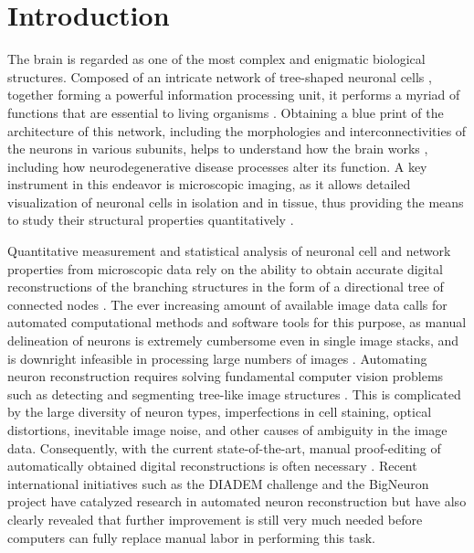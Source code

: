 \section{Introduction}
\label{sec:intro}
The brain is regarded as one of the most complex and enigmatic biological structures. Composed of an intricate network of tree-shaped neuronal cells \cite{ascolitrees}, together forming a powerful information processing unit, it performs a myriad of functions that are essential to living organisms \cite{kandel2000principles}. Obtaining a blue print of the architecture of this network, including the morphologies and interconnectivities of the neurons in various subunits, helps to understand how the brain works \cite{ascoli2002computational, donohue2008comparative, cuntz2010one}, including how  neurodegenerative disease processes alter its function. A key instrument in this endeavor is microscopic imaging, as it allows detailed visualization of neuronal cells in isolation and in tissue, thus providing the means to study their structural properties quantitatively \cite{senft2011brief}.

Quantitative measurement and statistical analysis of neuronal cell and network properties from microscopic data rely on the ability to obtain accurate digital reconstructions of the branching structures \cite{halavi2012digital} in the form of a directional tree of connected nodes \cite{ascoli2007neuromorpho}. The ever increasing amount of available image data calls for automated computational methods and software tools for this purpose, as manual delineation of neurons is extremely cumbersome even in single image stacks, and is downright infeasible in processing large numbers of images \cite{svoboda2011past, senft2011brief}. Automating neuron reconstruction requires solving fundamental computer vision problems such as detecting and segmenting tree-like image structures \cite{meijering2010neuron, donohue2011automated, acciai2016automated}. This is complicated by the large diversity of neuron types, imperfections in cell staining, optical distortions, inevitable image noise, and other causes of ambiguity in the image data. Consequently, with the current state-of-the-art, manual proof-editing of automatically obtained digital reconstructions is often necessary \cite{peng2011proof}. Recent international initiatives such as the DIADEM challenge \cite{gillette2011diademchallenge} and the BigNeuron project \cite{peng2015bigneuron, peng2015diadem} have catalyzed research in automated neuron reconstruction but have also clearly revealed that further improvement is still very much needed before computers can fully replace manual labor in performing this task.

